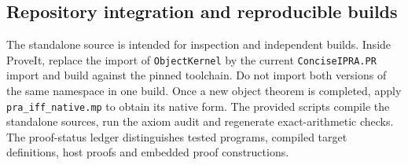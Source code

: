 \subsection{Repository integration and reproducible builds}

The standalone source is intended for inspection and independent builds.
Inside ProveIt, replace the import of \texttt{ObjectKernel} by the current
\texttt{ConciseIPRA.PR} import and build against the pinned toolchain.
Do not import both versions of the same namespace in one build. Once a
new object theorem is completed, apply \texttt{pra\_iff\_native.mp} to
obtain its native form. The provided scripts compile the standalone
sources, run the axiom audit and regenerate exact-arithmetic checks.
The proof-status ledger distinguishes tested programs, compiled target
definitions, host proofs and embedded proof constructions.
